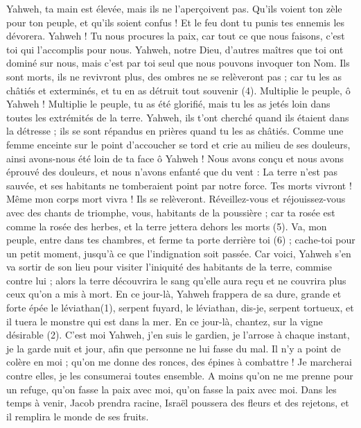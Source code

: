 \begin{multicols}{2}
Yahweh, ta main est élevée, mais ils ne l’aperçoivent pas. Qu’ils voient ton zèle pour ton peuple, et qu’ils soient confus ! Et le feu dont tu punis tes ennemis les dévorera.
Yahweh ! Tu nous procures la paix, car tout ce que nous faisons, c’est toi qui l’accomplis pour nous.
Yahweh, notre Dieu, d'autres maîtres que toi ont dominé sur nous, mais c'est par toi seul que nous pouvons invoquer ton Nom.
Ils sont morts, ils ne revivront plus, des ombres ne se relèveront pas ; car tu les as châtiés et exterminés, et tu en as détruit tout souvenir (4).
Multiplie le peuple, ô Yahweh ! Multiplie le peuple, tu as été glorifié, mais tu les as jetés loin dans toutes les extrémités de la terre.
Yahweh, ils t’ont cherché quand ils étaient dans la détresse ; ils se sont répandus en prières quand tu les as châtiés.
Comme une femme enceinte sur le point d’accoucher se tord et crie au milieu de ses douleurs, ainsi avons-nous été loin de ta face ô Yahweh !
Nous avons conçu et nous avons éprouvé des douleurs, et nous n’avons enfanté que du vent : La terre n’est pas sauvée, et ses habitants ne tomberaient point par notre force.
Tes morts vivront ! Même mon corps mort vivra ! Ils se relèveront. Réveillez-vous et réjouissez-vous avec des chants de triomphe, vous, habitants de la poussière ; car ta rosée est comme la rosée des herbes, et la terre jettera dehors les morts (5).
Va, mon peuple, entre dans tes chambres, et ferme ta porte derrière toi (6) ; cache-toi pour un petit moment, jusqu’à ce que l'indignation soit passée.
Car voici, Yahweh s'en va sortir de son lieu pour visiter l'iniquité des habitants de la terre, commise contre lui ; alors la terre découvrira le sang qu'elle aura reçu et ne couvrira plus ceux qu'on a mis à mort.
\VerseOne{}En ce jour-là, Yahweh frappera de sa dure, grande et forte épée le léviathan(1), serpent fuyard, le léviathan, dis-je, serpent tortueux, et il tuera le monstre qui est dans la mer.
En ce jour-là, chantez, sur la vigne désirable (2).
C'est moi Yahweh, j’en suis le gardien, je l'arrose à chaque instant, je la garde nuit et jour, afin que personne ne lui fasse du mal.
Il n'y a point de colère en moi ; qu'on me donne des ronces, des épines à combattre ! Je marcherai contre elles, je les consumerai toutes ensemble.
A moins qu’on ne me prenne pour un refuge, qu’on fasse la paix avec moi, qu’on fasse la paix avec moi.
Dans les temps à venir, Jacob prendra racine, Israël poussera des fleurs et des rejetons, et il remplira le monde de ses fruits.

\end{multicols}
